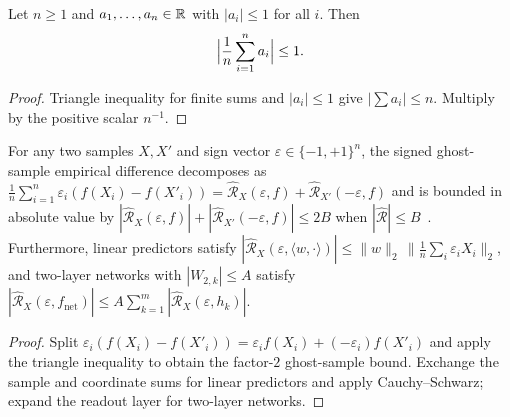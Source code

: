 \begin{lemma}\label{lem:bounded_mean}
\leanok
Let $n\ge 1$ and $a_1,\dots,a_n\in\mathbb{R}$ with $|a_i|\le 1$ for all $i$. Then
\[
\Bigl|\frac1n\sum_{i=1}^n a_i\Bigr| \le 1.
\]
\end{lemma}
\begin{proof}
\leanok
Triangle inequality for finite sums and $|a_i|\le 1$ give $\bigl|\sum a_i\bigr|\le n$. Multiply by the positive scalar $n^{-1}$.
\end{proof}

\begin{lemma}\label{lem:rademacher_bound}
\leanok
{}
For any two samples $X, X'$ and sign vector $\varepsilon\in\{-1,+1\}^n$, the signed ghost-sample empirical difference decomposes as $\frac{1}{n}\sum_{i=1}^n \varepsilon_i(f(X_i)-f(X'_i)) = \widehat{\mathcal{R}}_X(\varepsilon,f) + \widehat{\mathcal{R}}_{X'}(-\varepsilon,f)$ and is bounded in absolute value by $|\widehat{\mathcal{R}}_X(\varepsilon,f)| + |\widehat{\mathcal{R}}_{X'}(-\varepsilon,f)| \le 2 B$ when $|\widehat{\mathcal{R}}|\le B$~\cite{bartlett2002rademacher}. Furthermore, linear predictors satisfy $|\widehat{\mathcal{R}}_X(\varepsilon, \langle w,\cdot\rangle)| \le \|w\|_2\,\|\frac{1}{n}\sum_i \varepsilon_i X_i\|_2$, and two-layer networks with $|W_{2,k}|\le A$ satisfy $|\widehat{\mathcal{R}}_X(\varepsilon, f_{\mathrm{net}})| \le A\sum_{k=1}^m |\widehat{\mathcal{R}}_X(\varepsilon, h_k)|$.
\end{lemma}
\begin{proof}
\leanok
Split $\varepsilon_i(f(X_i)-f(X'_i)) = \varepsilon_i f(X_i) + (-\varepsilon_i)f(X'_i)$ and apply the triangle inequality to obtain the factor-$2$ ghost-sample bound. Exchange the sample and coordinate sums for linear predictors and apply Cauchy--Schwarz; expand the readout layer for two-layer networks.
\end{proof}

